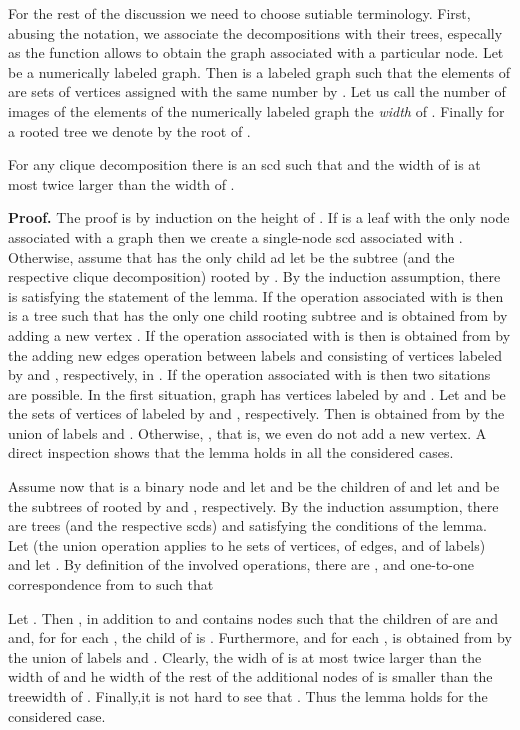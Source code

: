 \documentclass{llncs}
\begin{document}
For the rest of the discussion we need to choose sutiable terminology.
First, abusing the notation, we associate the decompositions with their trees,
especally as the function  allows to obtain the graph associated with 
a particular node. Let  be a numerically labeled graph. Then  
is a labeled graph such that the elements of  are sets of vertices assigned
with the same number by . Let us call the number of images of the elements of the
numerically labeled graph  the \emph{width} of . Finally for a rooted tree  we denote by
 the root of .   

\begin{lemma} \label{widthrelation}
For any clique decomposition  there is an {\sc scd}  such that 
 and the width of  is at most twice larger
than the width of .
\end{lemma}

{\bf Proof.}
The proof is by induction on the height of . If  is a leaf with the only
node associated with a graph  then we create a single-node {\sc scd} 
associated with . Otherwise, assume that  has the only child
 ad let  be the subtree (and the respective clique decomposition)
rooted by . By the induction assumption, there is  satisfying
the statement of the lemma. If the operation associated with  is 
then  is a tree such that  has the only one child  rooting
subtree  and  is obtained from  by adding a new
vertex . If the operation associated with  is  then
 is obtained from  by the adding new edges operation
between labels  and  consisting of vertices labeled by  and ,
respectively, in . If the operation associated with  is 
then two sitations are possible. In the first situation, graph  has 
vertices labeled by  and . Let  and  be the sets of vertices of
 labeled by  and , respectively. Then  is obtained from
 by the union of labels  and . Otherwise, , that is,
we even do not add a new vertex. A direct inspection shows that the lemma holds
in all the considered cases. 

Assume now that  is a binary node and let  and  be the children of
 and let  and  be the subtrees of  rooted by  and ,
respectively. By the induction assumption, there are trees (and the respective {\sc scd}s)
 and  satisfying the conditions of the lemma. Let 
 (the union operation applies to he sets of vertices,
of edges, and of labels) and let . By definition of the involved operations,
there are ,  and one-to-one
correspondence  from  to  such that 


Let . Then , in addition to  and  contains nodes
 such that the children of  are  and  and, for for each
, the child of  is . Furthermore,  and for each 
,  is obtained from  by the union of labels  and .
Clearly, the widh of  is at most twice larger than the width of  and he width of the
rest of the additional nodes of  is smaller than the treewidth of . Finally,it is not hard
to see that . Thus the lemma holds for the considered case. 
\end{document}
